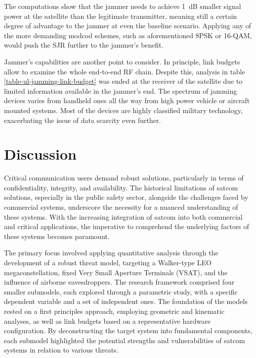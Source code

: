 \documentclass[english, 12pt, a4paper, elec, utf8, a-1b, online]{aaltothesis}
\begin{document}
The computations show that the jammer needs to achieve \SI{1}{\deci\bel} smaller signal power at the satellite than the legitimate transmitter, meaning still a certain degree of advantage to the jammer at even the baseline scenario.
Applying any of the more demanding modcod schemes, such as aforementioned 8PSK or 16-QAM, would push the SJR further to the jammer's benefit.

Jammer's capabilities are another point to consider.
In principle, link budgets allow to examine the whole end-to-end RF chain.
Despite this, analysis in table \ref{table-ul-jamming-link-budget} was ended at the receiver of the satellite due to limited information available in the jammer's end.
The spectrum of jamming devices varies from handheld ones all the way from high power vehicle or aircraft mounted systems.
Most of the devices are highly classified military technology, exacerbating the issue of data scarcity even further.

\section{Discussion}

Critical communication users demand robust solutions, particularly in terms of confidentiality, integrity, and availability. The historical limitations of satcom solutions, especially in the public safety sector, alongside the challenges faced by commercial systems, underscore the necessity for a nuanced understanding of these systems. With the increasing integration of satcom into both commercial and critical applications, the imperative to comprehend the underlying factors of these systems becomes paramount.

The primary focus involved applying quantitative analysis through the development of a robust threat model, targeting a Walker-type LEO megaconstellation, fixed Very Small Aperture Terminals (VSAT), and the influence of airborne eavesdroppers. The research framework comprised four smaller submodels, each explored through a parametric study, with a specific dependent variable and a set of independent ones.
The foundation of the models rested on a first principles approach, employing geometric and kinematic analyses, as well as link budgets based on a representative hardware configuration.
By deconstructing the target system into fundamental components, each submodel highlighted the potential strengths and vulnerabilities of satcom systems in relation to various threats.

\end{document}
